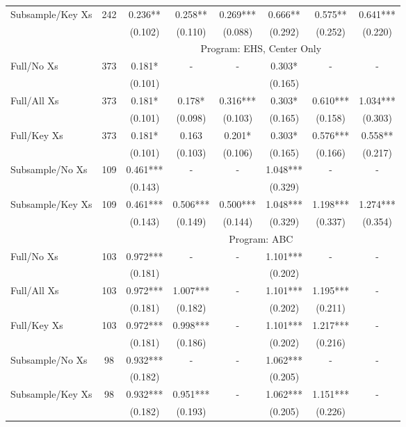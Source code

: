 \begin{tabular}{lccccccc}
Subsample/Key Xs & 242 & 0.236** & 0.258** & 0.269*** & 0.666** & 0.575** & 0.641*** \\
 &  & (0.102) & (0.110) & (0.088) & (0.292) & (0.252) & (0.220) \\
\midrule 
 &  & \multicolumn{6}{c}{Program: EHS, Center Only} \\
 \cmidrule(lr){3-8} 
Full/No Xs & 373 & 0.181* & - & - & 0.303* & - & - \\
 &  & (0.101) &  &  & (0.165) &  &  \\
Full/All Xs & 373 & 0.181* & 0.178* & 0.316*** & 0.303* & 0.610*** & 1.034*** \\
 &  & (0.101) & (0.098) & (0.103) & (0.165) & (0.158) & (0.303) \\
Full/Key Xs & 373 & 0.181* & 0.163 & 0.201* & 0.303* & 0.576*** & 0.558** \\
 &  & (0.101) & (0.103) & (0.106) & (0.165) & (0.166) & (0.217) \\
Subsample/No Xs & 109 & 0.461*** & - & - & 1.048*** & - & - \\
 &  & (0.143) &  &  & (0.329) &  &  \\
Subsample/Key Xs & 109 & 0.461*** & 0.506*** & 0.500*** & 1.048*** & 1.198*** & 1.274*** \\
 &  & (0.143) & (0.149) & (0.144) & (0.329) & (0.337) & (0.354) \\
\midrule 
 &  & \multicolumn{6}{c}{Program: ABC} \\
 \cmidrule(lr){3-8} 
Full/No Xs & 103 & 0.972*** & - & - & 1.101*** & - & - \\
 &  & (0.181) &  &  & (0.202) &  &  \\
Full/All Xs & 103 & 0.972*** & 1.007*** & - & 1.101*** & 1.195*** & - \\
 &  & (0.181) & (0.182) &  & (0.202) & (0.211) &  \\
Full/Key Xs & 103 & 0.972*** & 0.998*** & - & 1.101*** & 1.217*** & - \\
 &  & (0.181) & (0.186) &  & (0.202) & (0.216) &  \\
Subsample/No Xs & 98 & 0.932*** & - & - & 1.062*** & - & - \\
 &  & (0.182) &  &  & (0.205) &  &  \\
Subsample/Key Xs & 98 & 0.932*** & 0.951*** & - & 1.062*** & 1.151*** & - \\
 &  & (0.182) & (0.193) &  & (0.205) & (0.226) &  \\
\midrule 
\bottomrule 
\end{tabular}
